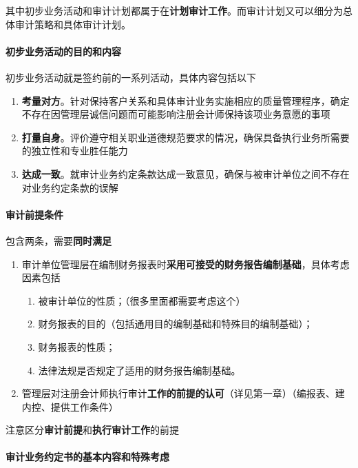 \documentclass[UTF8,12pt]{ctexart}
\numberwithin{equation}{section} %
\numberwithin{figure}{section}
\numberwithin{table}{section}
\begin{document}
	其中初步业务活动和审计计划都属于在\textbf{计划审计工作}。而审计计划又可以细分为总体审计策略和具体审计计划。
	
	\paragraph{初步业务活动的目的和内容}
	初步业务活动就是签约前的一系列活动，具体内容包括以下
	\begin{enumerate}
		\item \textbf{考量对方}。针对保持客户关系和具体审计业务实施相应的质量管理程序，确定不存在因管理层诚信问题而可能影响注册会计师保持该项业务意愿的事项
		
		\item \textbf{打量自身}。评价遵守相关职业道德规范要求的情况，确保具备执行业务所需要的独立性和专业胜任能力
		
		\item \textbf{达成一致}。就审计业务约定条款达成一致意见，确保与被审计单位之间不存在对业务约定条款的误解
	\end{enumerate}
	
	\paragraph{审计前提条件}
	包含两条，需要\textbf{同时满足}
	\begin{enumerate}
		\item 审计单位管理层在编制财务报表时\textbf{采用可接受的财务报告编制基础}，具体考虑因素包括
		\begin{enumerate}
			\item 被审计单位的性质；（很多里面都需要考虑这个）
			
			\item 财务报表的目的（包括通用目的编制基础和特殊目的编制基础）；
			
			\item 财务报表的性质；
			
			\item 法律法规是否规定了适用的财务报告编制基础。
		\end{enumerate}
		
		\item 管理层对注册会计师执行审计\textbf{工作的前提的认可}（详见第一章）（编报表、建内控、提供工作条件）
	\end{enumerate}
	
	注意区分\textbf{审计前提}和\textbf{执行审计工作}的前提
	
	\paragraph{审计业务约定书的基本内容和特殊考虑}
\end{document}
